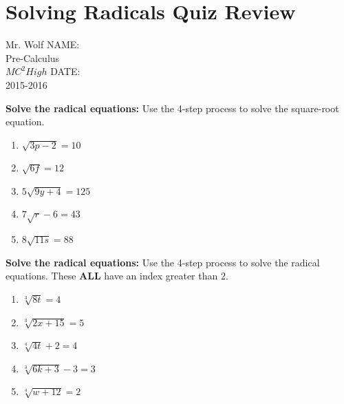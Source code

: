 \documentclass[12pt]{article}
\begin{document}
\pagebreak

\section{Solving Radicals Quiz Review}

Mr. Wolf \hfill NAME:\underline{\hspace{3in}}\\ 
Pre-Calculus \\ 
$MC^2 High$ \hfill DATE:\underline{\hspace{2in}}\\
2015-2016



\textbf{Solve the radical equations:} Use the 4-step process to solve the square-root equation.\\

\begin{enumerate}
	
		\item $\sqrt{3p-2}=10$\\
		
		\item $\sqrt{6f}=12$\\
		
		\item $5\sqrt{9y+4}=125$\\
		
		\item $7\sqrt{r}-6=43$\\
		
		\item $8\sqrt{11s}=88$\\
	
\end{enumerate}

\hrulefill

\textbf{Solve the radical equations:} Use the 4-step process to solve the radical equations. These \textbf{ALL} have an index greater than 2.\\

\begin{enumerate}[resume]

	\item $\sqrt[3]{8t}=4$\\
	
	
	\item $\sqrt[3]{2x+15}=5$\\
	
	
	\item $\sqrt[4]{4t}+2=4$\\
	
	
	\item $\sqrt[3]{6k+3}-3=3$\\
	
	
	\item $\sqrt[4]{w+12}=2$\\

\end{enumerate}
\end{document}
